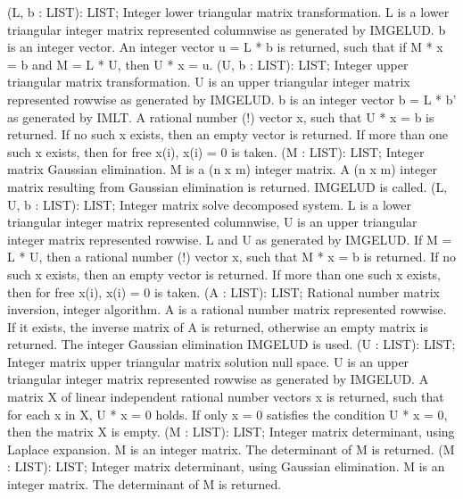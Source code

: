  (L, b : LIST): LIST; \eproc
\bcom Integer lower triangular matrix transformation.
L is a lower triangular integer matrix represented 
columnwise as generated by IMGELUD. b is an integer vector. 
An integer vector u = L * b is returned, such that 
if M * x = b and M = L * U, then U * x = u.  \ecom 
{} (U, b : LIST): LIST; \eproc
\bcom Integer upper triangular matrix transformation.
U is an upper triangular integer matrix represented rowwise
as generated by IMGELUD. b is an integer vector 
b = L * b' as generated by IMLT. A rational number (!) vector x, 
such that U * x = b is returned. If no such x exists, then an 
empty vector is returned. If more than one such x exists, then 
for free x(i), x(i) = 0 is taken.  \ecom 
{} (M : LIST): LIST; \eproc
\bcom Integer matrix Gaussian elimination. M is a (n x m) integer
matrix. A (n x m) integer matrix resulting from Gaussian 
elimination is returned. IMGELUD is called.  \ecom 
{} (L, U, b : LIST): LIST; \eproc
\bcom Integer matrix solve decomposed system. L is a lower
triangular integer matrix represented columnwise, U is an upper 
triangular integer matrix represented rowwise. L and U as 
generated by IMGELUD. If M = L * U, then a rational number (!) 
vector x, such that M * x = b is returned. If no such x exists, 
then an empty vector is returned. If more than one such x exists, 
then for free x(i), x(i) = 0 is taken.  \ecom 
{} (A : LIST): LIST; \eproc
\bcom Rational number matrix inversion, integer algorithm. A is a
rational number matrix represented rowwise. If it exists, 
the inverse matrix of A is returned, otherwise an empty matrix 
is returned. The integer Gaussian elimination IMGELUD is used.  \ecom 
{} (U : LIST): LIST; \eproc
\bcom Integer matrix upper triangular matrix solution null space.
U is an upper triangular integer matrix represented rowwise
as generated by IMGELUD. A matrix X of linear independent rational 
number vectors x is returned, such that for each x in X, U * x = 0 holds. 
If only x = 0 satisfies the condition U * x = 0, then the 
matrix X is empty.  \ecom 
{} (M : LIST): LIST; \eproc
\bcom Integer matrix determinant, using Laplace expansion.
M is an integer matrix. The determinant of M is returned.  \ecom 
{} (M : LIST): LIST; \eproc
\bcom Integer matrix determinant, using Gaussian elimination.
M is an integer matrix. The determinant of M is returned.  \ecom 

